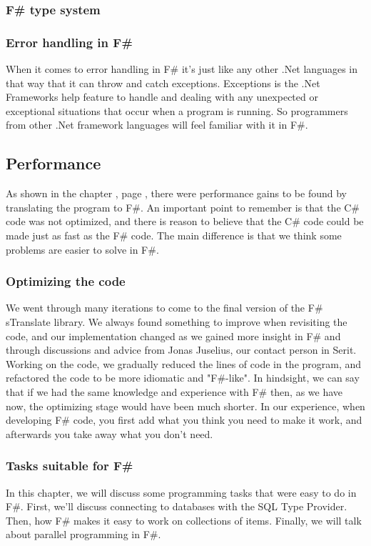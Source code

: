 \documentclass[12pt, a4paper]{article}
\begin{document}
\subsubsection{F\# type system}

\subsubsection{Error handling in F\#}
When it comes to error handling in F\# it's just like any other .Net languages in that way that it can throw and catch exceptions. Exceptions is the .Net Frameworks help feature to handle and dealing with any unexpected or exceptional situations that occur when a program is running. So programmers from other .Net framework languages will feel familiar with it in F\#. \\

\newpage

\subsection{Performance}
\label{AnalysisPerformance}
As shown in the chapter , page \pageref{sTranslatePerformance}, there were performance gains to be found by translating the program to F\#. An important point to remember is that the C\# code was not optimized, and there is reason to believe that the C\# code could be made just as fast as the F\# code. The main difference is that we think some problems are easier to solve in F\#.

\subsubsection{Optimizing the code}
We went through many iterations to come to the final version of the F\# sTranslate library. We always found something to improve when revisiting the code, and our implementation changed as we gained more insight in F\# and through discussions and advice from Jonas Juselius, our contact person in Serit. Working on the code, we gradually reduced the lines of code in the program, and refactored the code to be more idiomatic and "F\#-like". In hindsight, we can say that if we had the same knowledge and experience with F\# then, as we have now, the optimizing stage would have been much shorter. In our experience, when developing F\# code, you first add what you think you need to make it work, and afterwards you take away what you don't need.

\subsubsection{Tasks suitable for F\#}
In this chapter, we will discuss some programming tasks that were easy to do in F\#. First, we'll discuss connecting to databases with the SQL Type Provider. Then, how F\# makes it easy to work on collections of items. Finally, we will talk about parallel programming in F\#.
\end{document}
